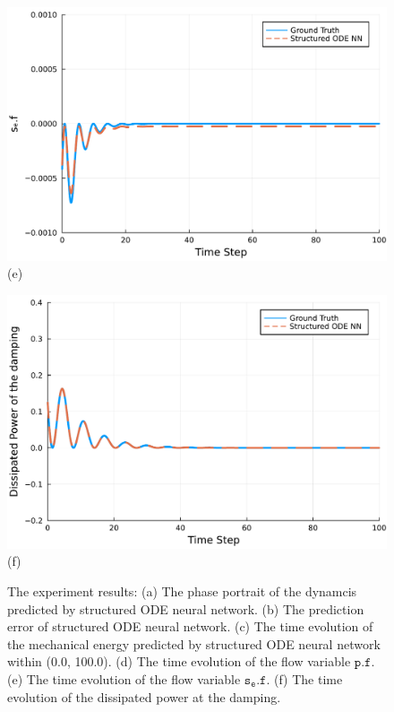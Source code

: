 \documentclass[
	parskip, 			   %
	twoside, 			   %
	DIV=14, 			   %
	BCOR=15.0mm, 		   %
	headsepline, 		   %
	open=right, 		   %
	captions=tableheading, %
	bibliography=totoc,    %
	numbers=noenddot       %
]{scrreprt}
\begin{document}
\begin{figure}[h!]
\begin{minipage}{.3\textwidth}
    \includegraphics[width=1\linewidth]{figures/se.f_compositional_idho.pdf}
    \\(e)
    \end{minipage}%
    \begin{minipage}{.3\textwidth}
    \centering
    \includegraphics[width=1\linewidth]{figures/dissipated_power_damping_idho.pdf}
    \\(f)
    \end{minipage}
    \caption{The experiment results: (a) The phase portrait of the dynamcis predicted by structured ODE neural network. (b) The prediction error of structured ODE neural network. (c) The time evolution of the mechanical energy predicted by structured ODE neural network within (0.0, 100.0). (d) The time evolution of the flow variable $\mathtt{p.f}$. (e) The time evolution of the flow variable $\mathtt{s_{e}.f}$. (f) The time evolution of the dissipated power at the damping.}
    \label{fig:idho_experiment}
\end{figure}
\end{document}
